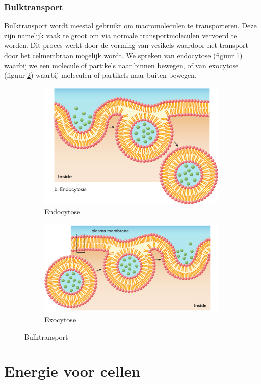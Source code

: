 \documentclass[a4paper,kul]{kulakarticle} %
\begin{document}
\subsubsection{Bulktransport}
Bulktransport wordt meestal gebruikt om macromoleculen te transporteren. Deze zijn namelijk vaak te groot om via normale transportmoleculen vervoerd te worden. Dit proces werkt door de vorming van vesikels waardoor het transport door het celmembraan mogelijk wordt. We spreken van endocytose (figuur \ref{fig:endocytose}) waarbij we een molecule of partikels naar binnen bewegen, of van exocytose (figuur \ref{fig:exocytose}) waarbij moleculen of partikels naar buiten bewegen. 
\begin{figure}[h]
	\centering
	\begin{subfigure}{.5\textwidth}
		\centering
		\includegraphics[width=0.7\linewidth]{endocytose}
		\caption{Endocytose}
		\label{fig:endocytose}
	\end{subfigure}%
	\begin{subfigure}{.5\textwidth}
		\centering
		\includegraphics[width=0.8\linewidth]{exocytose}
		\caption[Splitsing]{Exocytose}
		\label{fig:exocytose}
	\end{subfigure}
	\caption{Bulktransport}
	\label{fig:bulktransport}
\end{figure}
\newpage
\section{Energie voor cellen}
\label{sec:energie}
\end{document}
